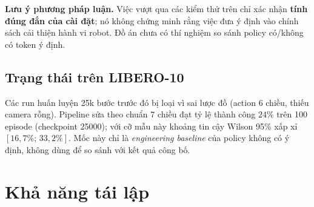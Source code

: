 \documentclass[12pt,a4paper]{report}
\begin{document}
\begin{table}[ht]
    \centering
    \small
    \caption{Tổng hợp kiểm thử kỹ thuật hạ tầng tích hợp SmolVLA.}
    \label{tab:vlia_integration_summary}
\end{table}

\textbf{Lưu ý phương pháp luận.} Việc vượt qua các kiểm thử trên chỉ xác nhận \textbf{tính đúng đắn của cài đặt}; nó không chứng minh rằng việc đưa ý định vào chính sách cải thiện hành vi robot. Đồ án chưa có thí nghiệm so sánh policy có/không có token ý định.

\subsection{Trạng thái trên LIBERO-10}
Các run huấn luyện 25k bước trước đó bị loại vì sai lược đồ (action 6 chiều, thiếu camera rỗng). Pipeline sửa theo chuẩn 7 chiều đạt tỷ lệ thành công $24\%$ trên 100 episode (checkpoint 25000); với cỡ mẫu này khoảng tin cậy Wilson 95\% xấp xỉ $[16{,}7\%;\,33{,}2\%]$. Mốc này chỉ là \emph{engineering baseline} của policy không có ý định, không dùng để so sánh với kết quả công bố.

\section{Khả năng tái lập}
\label{sec:reproducibility}
\end{document}
